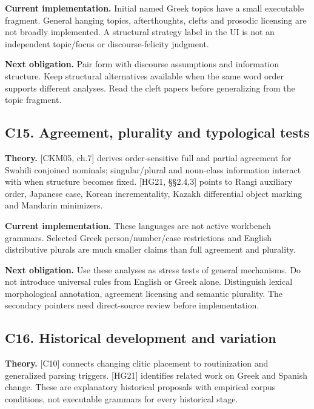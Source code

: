 \documentclass[11pt,a4paper]{article}
\begin{document}
\textbf{Current implementation.} Initial named Greek topics have a small
executable fragment. General hanging topics, afterthoughts, clefts and
prosodic licensing are not broadly implemented. A structural strategy
label in the UI is not an independent topic/focus or discourse-felicity
judgment.

\textbf{Next obligation.} Pair form with discourse assumptions and
information structure. Keep structural alternatives available when the
same word order supports different analyses. Read the cleft papers
before generalizing from the topic fragment.

\subsection{C15. Agreement, plurality and typological
tests}\label{c15.-agreement-plurality-and-typological-tests}

\textbf{Theory.} {[}CKM05, ch.7{]} derives order-sensitive full and
partial agreement for Swahili conjoined nominals; singular/plural and
noun-class information interact with when structure becomes fixed.
{[}HG21, §§2.4,3{]} points to Rangi auxiliary order, Japanese case,
Korean incrementality, Kazakh differential object marking and Mandarin
minimizers.

\textbf{Current implementation.} These languages are not active
workbench grammars. Selected Greek person/number/case restrictions and
English distributive plurals are much smaller claims than full agreement
and plurality.

\textbf{Next obligation.} Use these analyses as stress tests of general
mechanisms. Do not introduce universal rules from English or Greek
alone. Distinguish lexical morphological annotation, agreement licensing
and semantic plurality. The secondary pointers need direct-source review
before implementation.

\subsection{C16. Historical development and
variation}\label{c16.-historical-development-and-variation}

\textbf{Theory.} {[}C10{]} connects changing clitic placement to
routinization and generalized parsing triggers. {[}HG21{]} identifies
related work on Greek and Spanish change. These are explanatory
historical proposals with empirical corpus conditions, not executable
grammars for every historical stage.
\end{document}
